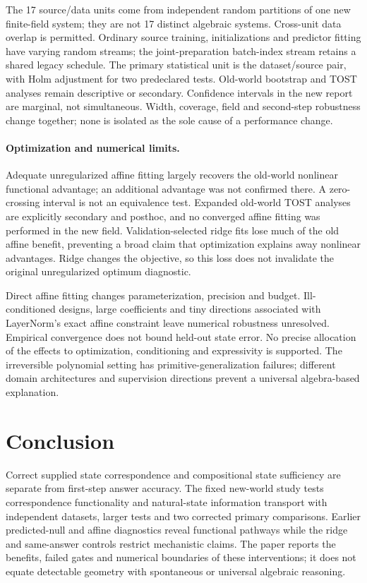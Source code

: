 The 17 source/data units come from independent random partitions of one new finite-field system; they are not 17 distinct algebraic systems. Cross-unit data overlap is permitted. Ordinary source training, initializations and predictor fitting have varying random streams; the joint-preparation batch-index stream retains a shared legacy schedule. The primary statistical unit is the dataset/source pair, with Holm adjustment for two predeclared tests. Old-world bootstrap and TOST analyses remain descriptive or secondary. Confidence intervals in the new report are marginal, not simultaneous. Width, coverage, field and second-step robustness change together; none is isolated as the sole cause of a performance change.

\paragraph{Optimization and numerical limits.}
Adequate unregularized affine fitting largely recovers the old-world nonlinear functional advantage; an additional advantage was not confirmed there. A zero-crossing interval is not an equivalence test. Expanded old-world TOST analyses are explicitly secondary and posthoc, and no converged affine fitting was performed in the new field. Validation-selected ridge fits lose much of the old affine benefit, preventing a broad claim that optimization explains away nonlinear advantages. Ridge changes the objective, so this loss does not invalidate the original unregularized optimum diagnostic.

Direct affine fitting changes parameterization, precision and budget. Ill-conditioned designs, large coefficients and tiny directions associated with LayerNorm's exact affine constraint leave numerical robustness unresolved. Empirical convergence does not bound held-out state error. No precise allocation of the effects to optimization, conditioning and expressivity is supported. The irreversible polynomial setting has primitive-generalization failures; different domain architectures and supervision directions prevent a universal algebra-based explanation.

\section{Conclusion}
Correct supplied state correspondence and compositional state sufficiency are separate from first-step answer accuracy. The fixed new-world study tests correspondence functionality and natural-state information transport with independent datasets, larger tests and two corrected primary comparisons. Earlier predicted-null and affine diagnostics reveal functional pathways while the ridge and same-answer controls restrict mechanistic claims. The paper reports the benefits, failed gates and numerical boundaries of these interventions; it does not equate detectable geometry with spontaneous or universal algebraic reasoning.
